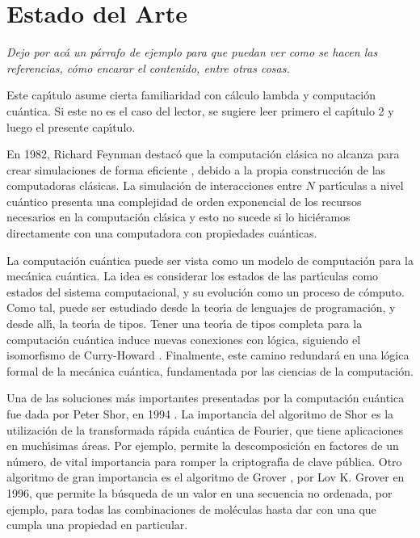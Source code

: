 \chapter{Estado del Arte}

\emph{Dejo por acá un párrafo de ejemplo para que puedan ver como se hacen las referencias, cómo encarar el contenido, entre otras cosas.}

Este cap\'{\i}tulo asume cierta familiaridad con c\'alculo lambda y computaci\'on cu\'antica. Si este no es el caso del lector, se sugiere leer primero el cap\'{\i}tulo 2 y luego el presente cap\'{\i}tulo.

En 1982, Richard Feynman destac\'o que la computaci\'on cl\'asica no alcanza para crear simulaciones de forma eficiente \parencite{Feynman1982}, debido
a la propia construcci\'on de las computadoras cl\'asicas.
La simulaci\'on de interacciones entre \(N\) part\'{\i}culas a nivel cu\'antico presenta una complejidad de orden exponencial de los recursos necesarios en la computaci\'on cl\'asica y esto no sucede si lo hici\'eramos directamente con una computadora con propiedades cu\'anticas.

La computaci\'on cu\'antica puede ser vista como un modelo de computaci\'on para la mec\'anica cu\'antica. La idea es considerar
los estados de las part\'{\i}culas como estados del sistema computacional, y su evoluci\'on como un proceso de c\'omputo. Como tal,
puede ser estudiado desde la teor\'{\i}a de lenguajes de programaci\'on, y desde all\'{\i}, la teor\'{\i}a de tipos. Tener una teor\'{\i}a
de tipos completa para la computaci\'on cu\'antica induce nuevas conexiones con l\'ogica, siguiendo el isomorfismo de Curry-Howard \parencite{SorensenUrzyczyn2006}. Finalmente, este camino redundar\'a en una l\'ogica formal de la mec\'anica cu\'antica, fundamentada
por las ciencias de la computaci\'on.

Una de las soluciones m\'as importantes presentadas por la computaci\'on cu\'antica fue dada por Peter Shor,
en 1994 \parencite{Shor1994}. La importancia del algoritmo de Shor es la utilizaci\'on de la transformada r\'apida cu\'antica de Fourier, que tiene aplicaciones en much\'{\i}simas \'areas. Por ejemplo, permite la descomposici\'on en factores de un n\'umero, de vital importancia
para romper la criptograf\'{\i}a de clave p\'ublica. Otro algoritmo de gran importancia es el algoritmo de Grover \parencite{Grover1996},
por Lov K. Grover en 1996, que permite la b\'usqueda de un valor en una secuencia no ordenada, por ejemplo, para todas las combinaciones de mol\'eculas hasta dar con una que cumpla una propiedad en particular.

